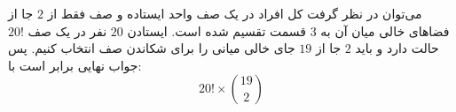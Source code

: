 می‌توان در نظر گرفت کل افراد در یک صف واحد ایستاده و صف فقط از
$2$
 جا از فضاهای خالی میان آن به
$3$
  قسمت تقسیم شده است. ایستادن
$20$
   نفر در یک صف
$20!$ 
   حالت دارد و باید
$2$
    جا از
$19$ 
    جای خالی میانی را برای شکاندن صف انتخاب کنیم. پس جواب نهایی برابر است با:
    \[20! \times \binom{19}{2}\]